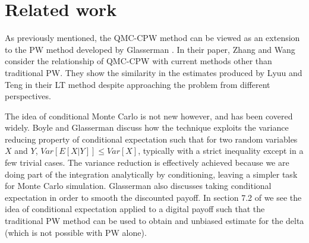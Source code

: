 \section{Related work}
As previously mentioned, the QMC-CPW method \cite{ZhangConditionalQuasiMonteCarloMethod} can be viewed as an extension to the PW method developed by Glasserman \cite{glasserman1991gradient}. In their paper, Zhang and Wang consider the relationship of QMC-CPW with current methods other than traditional PW. They show the similarity in the estimates produced by Lyuu and Teng in their LT method \cite{LyuuYuh-Dauh2010UaeG} despite approaching the problem from different perspectives.

The idea of conditional Monte Carlo is not new however, and has been covered widely. Boyle and Glasserman \cite{boyle1997monte} discuss how the technique exploits the variance reducing property of conditional expectation such that for two random variables $X$ and $Y$, $Var[E[X|Y]] \le Var[X]$, typically with a strict inequality except in a few trivial cases. The variance reduction is effectively achieved because we are doing part of the integration analytically by conditioning, leaving a simpler task for Monte Carlo simulation. Glasserman also discusses taking conditional expectation in order to smooth the discounted payoff. In section 7.2 of \cite{glasserman2004monte} we see the idea of conditional expectation applied to a digital payoff such that the traditional PW method can be used to obtain and unbiased estimate for the delta (which is not possible with PW alone).
